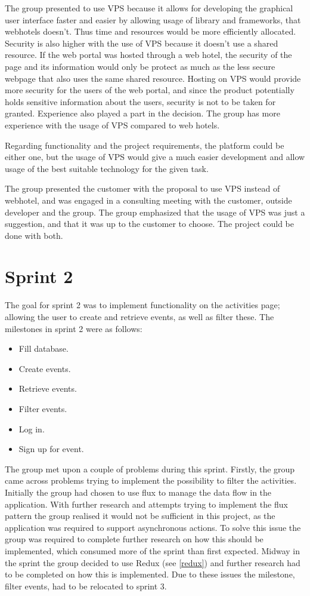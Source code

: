 The group presented to use VPS because it allows for developing the graphical user interface faster and easier by allowing usage of library and frameworks, that webhotels doesn't.  Thus time and resources would be more efficiently allocated. Security is also higher with the use of VPS because it doesn't use a shared resource. If the web portal was hosted through a web hotel, the security of the page and its information would only be protect as much as the less secure webpage that also uses the same shared resource. Hosting on VPS would provide more security for the users of the web portal, and since the product potentially holds sensitive information about the users, security is not to be taken for granted.  Experience also played a part in the decision. The group has more experience with the usage of VPS compared to web hotels. 

Regarding functionality and the project requirements, the platform could be either one, but the usage of VPS would give a much easier development and allow usage of the best suitable technology for the given task. 

The group presented the customer with the proposal to use VPS instead of webhotel, and was engaged in a consulting meeting with the customer, outside developer and the group. The group emphasized that the usage of VPS was just a suggestion, and that it was up to the customer to choose. The project could be done with both.  

\section{Sprint 2}
The goal for sprint 2 was to implement functionality on the activities page; allowing the user to create and retrieve events, as well as filter these. The milestones in sprint 2 were as follows:

\begin{itemize}
  \item Fill database.
  \item Create events.
  \item Retrieve events.
  \item Filter events.
  \item Log in.
  \item Sign up for event.
\end{itemize}

The group met upon a couple of problems during this sprint. Firstly, the group came across problems trying to implement the possibility to filter the activities. Initially the group had chosen to use flux to manage the data flow in the application. With further research and attempts trying to implement the flux pattern the group realised it would not be sufficient in this project, as the application was required to support asynchronous actions. To solve this issue the group was required to complete further research on how this should be implemented, which consumed more of the sprint than first expected. Midway in the sprint the group decided to use Redux (see \ref{redux}) and further research had to be completed on how this is implemented. Due to these issues the milestone, filter events, had to be relocated to sprint 3. 

